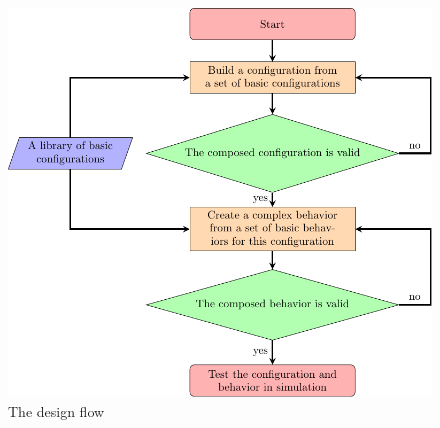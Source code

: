 \documentclass[conference]{IEEEtran}
\theoremstyle{definition}
\begin{document}
\begin{figure}
\begin{center}
\includegraphics[width=0.9\columnwidth]{images/tikz/design_diagram.pdf}
\caption{The design flow}
\label{fig:design}
\end{center}
\end{figure}
\end{document}
